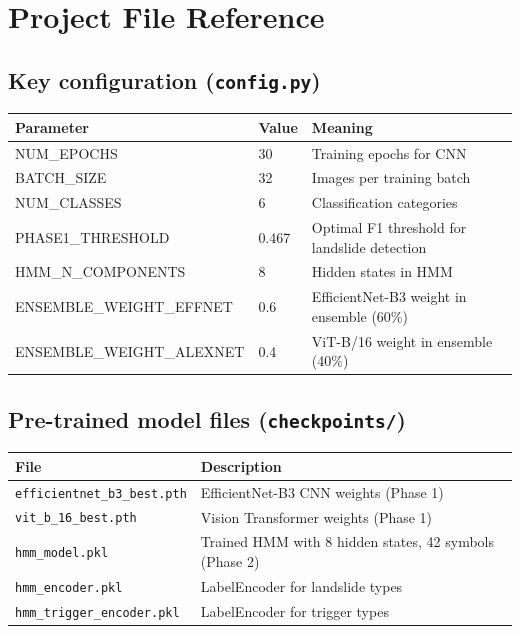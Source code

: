 \documentclass[11pt]{article}
\begin{document}
\section{Project File Reference}

\subsection{Key configuration (\texttt{config.py})}

\begin{table}[H]
    \centering
    \renewcommand{\arraystretch}{1.2}
    \begin{tabular}{lll}
        \toprule
        \textbf{Parameter} & \textbf{Value} & \textbf{Meaning} \\
        \midrule
        NUM\_EPOCHS & 30 & Training epochs for CNN \\
        BATCH\_SIZE & 32 & Images per training batch \\
        NUM\_CLASSES & 6 & Classification categories \\
        PHASE1\_THRESHOLD & 0.467 & Optimal F1 threshold for landslide detection \\
        HMM\_N\_COMPONENTS & 8 & Hidden states in HMM \\
        ENSEMBLE\_WEIGHT\_EFFNET & 0.6 & EfficientNet-B3 weight in ensemble (60\%) \\
        ENSEMBLE\_WEIGHT\_ALEXNET & 0.4 & ViT-B/16 weight in ensemble (40\%) \\
        \bottomrule
    \end{tabular}
\end{table}

\subsection{Pre-trained model files (\texttt{checkpoints/})}

\begin{table}[H]
    \centering
    \renewcommand{\arraystretch}{1.2}
    \begin{tabular}{lp{9cm}}
        \toprule
        \textbf{File} & \textbf{Description} \\
        \midrule
        \texttt{efficientnet\_b3\_best.pth} & EfficientNet-B3 CNN weights (Phase 1) \\
        \texttt{vit\_b\_16\_best.pth} & Vision Transformer weights (Phase 1) \\
        \texttt{hmm\_model.pkl} & Trained HMM with 8 hidden states, 42 symbols (Phase 2) \\
        \texttt{hmm\_encoder.pkl} & LabelEncoder for landslide types \\
        \texttt{hmm\_trigger\_encoder.pkl} & LabelEncoder for trigger types \\
        \bottomrule
    \end{tabular}
\end{table}
\end{document}
